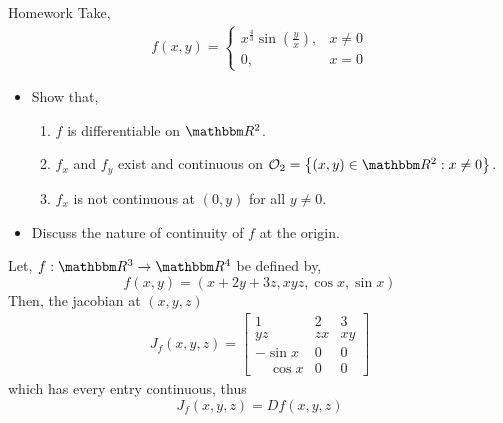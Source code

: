 \documentclass[Analysis-3]{subfiles}
\begin{document}
\begin{Eg}{Homework}{}
  Take, \begin{align*}
    f(x,y) = \begin{cases}
               x^{\frac{4}{3}}\sin{\left( \frac{y}{x} \right)}, & x \not= 0 \\
               0,                                               & x = 0
             \end{cases}
  \end{align*}
  \begin{itemize}
    \item Show that, \begin{enumerate}
            \item $ f $ is differentiable on $ \R^2 $.
            \item $ f_x $ and $ f_y $ exist and continuous on $ \Op{2} = \left\{ (x,y)\in\R^2 : x \not= 0 \right\} $.
            \item $ f_x $ is not continuous at $ (0,y) $ for all $ y \not= 0 $.
          \end{enumerate}
    \item Discuss the nature of continuity of $ f $ at the origin.
  \end{itemize}
\end{Eg}

\begin{Eg}{}{}
  Let, $ f:\R^3 \to \R^4 $ be defined by, \[ f(x,y) = \left( x+2y+3z, xyz, \cos{x}, \sin{x} \right) \]
  Then, the jacobian at $ (x,y,z) $  \begin{align*}
    J_{f}(x,y,z) = \begin{bmatrix}
                     1             & 2  & 3  \\
                     yz            & zx & xy \\
                     -\sin{x}      & 0  & 0  \\
                     \quad \cos{x} & 0  & 0
                   \end{bmatrix}
  \end{align*}
  which has every entry continuous, thus \[J_{f}(x,y,z) = Df(x,y,z)\]
\end{Eg}
\end{document}
